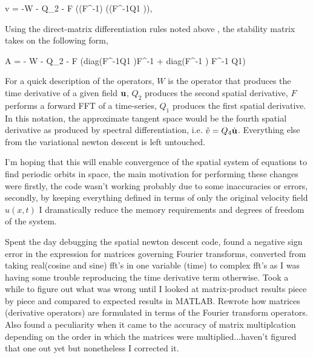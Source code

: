 \beq \label{e-FksXdirectmatrix}
v = -W \dot \utensor - Q_2 \dot \utensor - F \dot ((F^{-1}\dot \utensor) \star ((F^{-1}\dot Q1 \utensor)),
\eeq

Using the direct-matrix differentiation rules noted above , the stability matrix takes on the following form,

\beq \label{e-FksXdirectStbMat}
A = - W - Q_2 - F \dot (diag(F^{-1}\dot Q1 \dot \utensor)\dot F^{-1} + diag(F^{-1} \dot \utensor) \dot F^{-1} \dot Q1)
\eeq

For a quick description of the operators, $W$ is the operator that produces the time derivative of a given field
$\mathbf{u}$, $Q_2$ produces the second spatial derivative, $F$ performs a forward FFT of a time-series, $Q_1$ produces
the first spatial derivative. In this notation, the approximate tangent space would be the fourth spatial derivative
as produced by spectral differentiation, i.e. $\tilde{v} = Q_4 \dot {\mathbf{u}}$. Everything else from the variational
{newton descent} is left untouched.

I'm hoping that this will enable convergence of the spatial system of equations to find periodic orbits in space, the
main motivation for performing these changes were firstly, the code wasn't working probably due to some inaccuracies or errors,
secondly, by keeping
everything defined in terms of only the original velocity field $u(x, t)$ I dramatically reduce the memory
requirements and degrees of freedom of the system.

Spent the day debugging the spatial {newton descent} code, found a negative sign error in the expression for
matrices governing Fourier transforms, converted from taking real(cosine and sine) fft's in one variable (time) to complex fft's
as I was having some trouble reproducing the time derivative term otherwise. Took a while to figure out what was wrong until
I looked at matrix-product results piece by piece and compared to expected results in MATLAB. Rewrote how matrices (derivative
operators) are formulated in terms of the Fourier transform operators. Also found a peculiarity when it came to the accuracy
of matrix multiplcation depending on the order in which the matrices were multiplied...haven't figured that one out yet but nonetheless
I corrected it.

